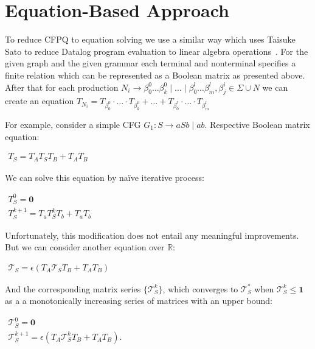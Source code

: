 \documentclass[sigconf]{acmart}
\begin{document}
\section{Equation-Based Approach}

To reduce CFPQ to equation solving we use a similar way which uses Taisuke Sato to reduce Datalog program evaluation to linear algebra operations~\cite{sato2017linear}.
For the given graph and the given grammar each terminal and nonterminal specifies a finite relation which can be represented as a Boolean matrix as presented above.
After that for each production $N_i \to \beta^0_0 \dots \beta^0_k \mid \ldots \mid \beta^l_0 \dots \beta^l_m, \beta^i_j \in \Sigma \cup N$ we can create an equation $T_{N_i} = T_{\beta^0_0}\cdot \ldots \cdot T_{\beta^0_k} + \ldots + T_{\beta^l_0}\cdot \ldots \cdot T_{\beta^l_m} $


For example, consider a simple CFG $G_1 : S \rightarrow aSb \mid ab$. 
Respective Boolean matrix equation:

\begin{center}
\(
\left. 
\begin{array}{l}
T_S = T_AT_ST_B + T_AT_B
\end{array} 
\right.
\)
\end{center}

We can solve this equation by na\"ive iterative process:
\begin{center}
\(
\left. 
\begin{array}{l}
T_S^0 = \mathbf{0} \\
T_S^{k+1} = T_a T_S^k T_b + T_a T_b
\end{array} 
\right.
\)
\end{center}

Unfortunately, this modification does not entail any meaningful improvements. 
But we can consider another equation over $\mathbb{R}$:

\begin{center}
\(
\left. 
\begin{array}{l}
\mathcal{T}_S = \epsilon(T_A \mathcal{T}_S T_B + T_A T_B)
\end{array}
\right.
\)
\end{center}

And the corresponding matrix series $\{ \mathcal{T}_S^{k}\}$, which converges to $\mathcal{T}_S^*$ when $\mathcal{T}_S^{k} \leq \textbf{1}$ as a a monotonically increasing series of matrices with an upper bound:

\begin{center}
\(
\left.
\begin{array}{c}
\mathcal{T}_S^0 = \mathbf{0} \\
\mathcal{T}_S^{k+1} = \epsilon(T_A \mathcal{T}_S^k T_B + T_A T_B).
\end{array} 
\right.
\)
\end{center}
\end{document}
